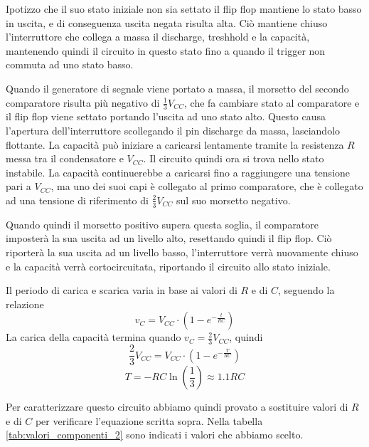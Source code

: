 \noindent
Ipotizzo che il suo stato iniziale non sia settato il flip flop mantiene lo stato basso in uscita, e di conseguenza uscita negata risulta alta. Ciò mantiene chiuso l'interruttore che collega a massa il discharge, treshhold e la capacità, mantenendo quindi il circuito in questo stato fino a quando il trigger non commuta ad uno stato basso.

\noindent
Quando il generatore di segnale viene portato a massa, il morsetto del secondo comparatore risulta più negativo di $\frac{1}{3}V_{CC}$, che fa cambiare stato al comparatore e il flip flop viene settato portando l'uscita ad uno stato alto. Questo causa l'apertura dell'interruttore scollegando il pin discharge da massa, lasciandolo flottante.
La capacità può iniziare a caricarsi lentamente tramite la resistenza $R$ messa tra il condensatore e $V_{CC}$. Il circuito quindi ora si trova nello stato instabile. La capacità continuerebbe a caricarsi fino a raggiungere una tensione pari a $V_{CC}$, ma uno dei suoi capi è collegato al primo comparatore, che è collegato ad una tensione di riferimento di $\frac{2}{3}V_{CC}$ sul suo morsetto negativo. 

\noindent
Quando quindi il morsetto positivo supera questa soglia, il comparatore imposterà la sua uscita ad un livello alto, resettando quindi il flip flop. Ciò riporterà la sua uscita ad un livello basso, l'interruttore verrà nuovamente chiuso e la capacità verrà cortocircuitata, riportando il circuito allo stato iniziale.

\noindent
Il periodo di carica e scarica varia in base ai valori di $R$ e di $C$, seguendo la relazione
\[v_C = V_{CC}\cdot\left(1-e^{-\frac{t}{RC}}\right)\]
La carica della capacità termina quando $v_C = \frac{2}{3}V_{CC}$, quindi
\[\frac{2}{3}V_{CC} = V_{CC}\cdot\left(1-e^{-\frac{T}{RC}}\right)\]
\[T=-RC\ln\left(\frac{1}{3}\right)\approx1.1RC\]

Per caratterizzare questo circuito abbiamo quindi provato a sostituire valori di $R$ e di $C$ per verificare l'equazione scritta sopra. Nella tabella \ref{tab:valori_componenti_2} sono indicati i valori che abbiamo scelto.

